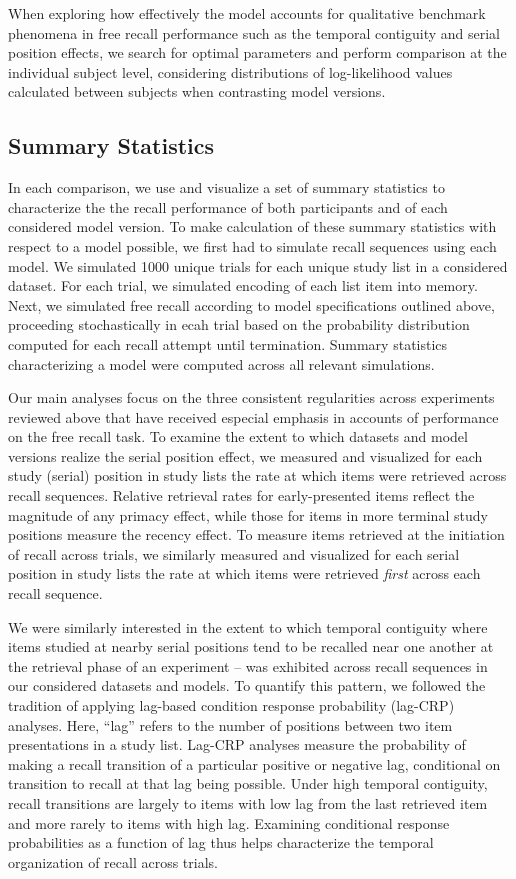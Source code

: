 \documentclass[
  letterpaper,
  DIV=11,
  numbers=noendperiod]{scrreport}
\begin{document}
When exploring how effectively the model accounts for qualitative
benchmark phenomena in free recall performance such as the temporal
contiguity and serial position effects, we search for optimal parameters
and perform comparison at the individual subject level, considering
distributions of log-likelihood values calculated between subjects when
contrasting model versions.

\hypertarget{summary-statistics}{%
\subsection{Summary Statistics}\label{summary-statistics}}

In each comparison, we use and visualize a set of summary statistics to
characterize the the recall performance of both participants and of each
considered model version. To make calculation of these summary
statistics with respect to a model possible, we first had to simulate
recall sequences using each model. We simulated 1000 unique trials for
each unique study list in a considered dataset. For each trial, we
simulated encoding of each list item into memory. Next, we simulated
free recall according to model specifications outlined above, proceeding
stochastically in ecah trial based on the probability distribution
computed for each recall attempt until termination. Summary statistics
characterizing a model were computed across all relevant simulations.

Our main analyses focus on the three consistent regularities across
experiments reviewed above that have received especial emphasis in
accounts of performance on the free recall task. To examine the extent
to which datasets and model versions realize the serial position effect,
we measured and visualized for each study (serial) position in study
lists the rate at which items were retrieved across recall sequences.
Relative retrieval rates for early-presented items reflect the magnitude
of any primacy effect, while those for items in more terminal study
positions measure the recency effect. To measure items retrieved at the
initiation of recall across trials, we similarly measured and visualized
for each serial position in study lists the rate at which items were
retrieved \emph{first} across each recall sequence.

We were similarly interested in the extent to which temporal contiguity
where items studied at nearby serial positions tend to be recalled near
one another at the retrieval phase of an experiment -- was exhibited
across recall sequences in our considered datasets and models. To
quantify this pattern, we followed the tradition of applying lag-based
condition response probability (lag-CRP) analyses. Here, ``lag'' refers
to the number of positions between two item presentations in a study
list. Lag-CRP analyses measure the probability of making a recall
transition of a particular positive or negative lag, conditional on
transition to recall at that lag being possible. Under high temporal
contiguity, recall transitions are largely to items with low lag from
the last retrieved item and more rarely to items with high lag.
Examining conditional response probabilities as a function of lag thus
helps characterize the temporal organization of recall across trials.
\end{document}
